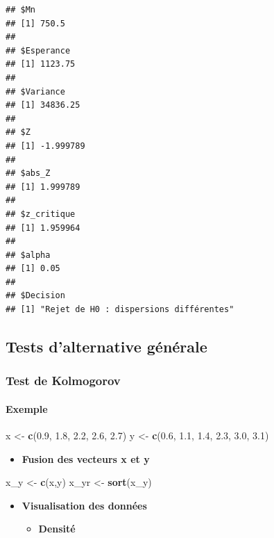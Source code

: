 \documentclass[
  12pt,
]{article}
\newenvironment{Shaded}{\begin{snugshade}}{\end{snugshade}}
\newcommand{\FloatTok}[1]{\textcolor[rgb]{0.00,0.00,0.81}{#1}}
\newcommand{\FunctionTok}[1]{\textcolor[rgb]{0.13,0.29,0.53}{\textbf{#1}}}
\newcommand{\NormalTok}[1]{#1}
\newcommand{\OtherTok}[1]{\textcolor[rgb]{0.56,0.35,0.01}{#1}}
\providecommand{\tightlist}{%
  \setlength{\itemsep}{0pt}\setlength{\parskip}{0pt}}
\begin{document}
\begin{verbatim}
## $Mn
## [1] 750.5
## 
## $Esperance
## [1] 1123.75
## 
## $Variance
## [1] 34836.25
## 
## $Z
## [1] -1.999789
## 
## $abs_Z
## [1] 1.999789
## 
## $z_critique
## [1] 1.959964
## 
## $alpha
## [1] 0.05
## 
## $Decision
## [1] "Rejet de H0 : dispersions différentes"
\end{verbatim}

\subsection{Tests d'alternative
générale}\label{tests-dalternative-guxe9nuxe9rale}

\subsubsection{Test de Kolmogorov}\label{test-de-kolmogorov}

\paragraph{Exemple}\label{exemple}

\begin{Shaded}
\begin{Highlighting}[]
\NormalTok{x }\OtherTok{\textless{}{-}} \FunctionTok{c}\NormalTok{(}\FloatTok{0.9}\NormalTok{, }\FloatTok{1.8}\NormalTok{, }\FloatTok{2.2}\NormalTok{, }\FloatTok{2.6}\NormalTok{, }\FloatTok{2.7}\NormalTok{)      }
\NormalTok{y }\OtherTok{\textless{}{-}} \FunctionTok{c}\NormalTok{(}\FloatTok{0.6}\NormalTok{, }\FloatTok{1.1}\NormalTok{, }\FloatTok{1.4}\NormalTok{, }\FloatTok{2.3}\NormalTok{, }\FloatTok{3.0}\NormalTok{, }\FloatTok{3.1}\NormalTok{) }
\end{Highlighting}
\end{Shaded}

\begin{itemize}
\tightlist
\item
  \textbf{Fusion des vecteurs x et y}
\end{itemize}

\begin{Shaded}
\begin{Highlighting}[]
\NormalTok{x\_y }\OtherTok{\textless{}{-}} \FunctionTok{c}\NormalTok{(x,y)}
\NormalTok{x\_yr }\OtherTok{\textless{}{-}} \FunctionTok{sort}\NormalTok{(x\_y)}
\end{Highlighting}
\end{Shaded}

\begin{itemize}
\item
  \textbf{Visualisation des données}

  \begin{itemize}
  \tightlist
  \item
    \textbf{Densité}
  \end{itemize}
\end{itemize}
\end{document}
